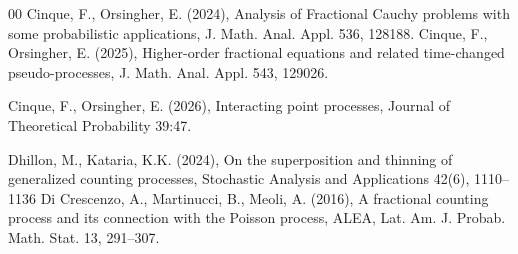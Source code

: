 \documentclass[12pt, twoside, english, headsepline]{article}
\theoremstyle{definition} %
\numberwithin{equation}{section} %
\begin{document}
{\begin{thebibliography}{00}
%
%
%
%
Cinque, F., Orsingher, E. (2024), Analysis of Fractional Cauchy problems with some probabilistic applications, J. Math. Anal. Appl. 536, 128188.
%
Cinque, F., Orsingher, E. (2025), Higher-order fractional equations and related time-changed pseudo-processes, J. Math. Anal. Appl. 543, 129026.

Cinque, F., Orsingher, E. (2026), Interacting point processes, Journal of Theoretical Probability 39:47.

%
%
%
%
Dhillon, M., Kataria, K.K. (2024), On the superposition and thinning of generalized counting processes, Stochastic Analysis and Applications 42(6), 1110--1136
%
Di Crescenzo, A., Martinucci, B., Meoli, A. (2016), A fractional counting process and its connection with the Poisson process, ALEA, Lat. Am. J. Probab. Math. Stat. 13, 291--307.


\end{thebibliography}}
\end{document}
